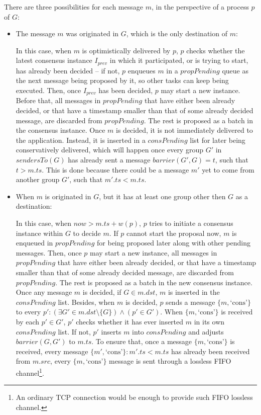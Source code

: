 \documentclass[times, 10pt]{article}
\begin{document}
There are three possibilities for each message $m$, in the perspective of a process $p$ of $G$:

\begin{itemize}
  \item The message $m$ was originated in $G$, which is the only destination of $m$:
  
  In this case, when $m$ is optimistically delivered by $p$, $p$ checks whether the latest consensus instance $I_{prev}$ in which it participated, or is trying to start, has already been decided -- if not, $p$ enqueues $m$ in a $propPending$ queue as the next message being proposed by it, so other tasks can keep being executed. Then, once $I_{prev}$ has been decided, $p$ may start a new instance. Before that, all messages in $propPending$ that have either been already decided, or that have a timestamp smaller than that of some already decided message, are discarded from $propPending$. The rest is proposed as a batch in the consensus instance. Once $m$ is decided, it is not immediately delivered to the application. Instead, it is inserted in a $consPending$ list for later being conservatively delivered, which will happen once every group $G'$ in $sendersTo(G)$ has already sent a message $barrier(G',G) = t$, such that $t > m.ts$. This is done because there could be a message $m'$ yet to come from another group $G'$, such that $m'.ts < m.ts$.

  \item When $m$ is originated in $G$, but it has at least one group other then $G$ as a destination:
  
  In this case, when $now > m.ts + w(p)$, $p$ tries to initiate a consensus instance within $G$ to decide $m$. If $p$ cannot start the proposal now, $m$ is enqueued in $propPending$ for being proposed later along with other pending messages. Then, once $p$ may start a new instance, all messages in $propPending$ that have either been already decided, or that have a timestamp smaller than that of some already decided message, are discarded from $propPending$. The rest is proposed as a batch in the new consensus instance. Once any message $m$ is decided, if $G \in m.dst$, $m$ is inserted in the $consPending$ list. Besides, when $m$ is decided, $p$ sends a message $\{m, \text{`cons'}\}$ to every \mbox{$p' : (\exists G' \in m.dst \setminus \{G\}) \wedge (p' \in G')$}. When $\{m, \text{`cons'}\}$ is received by each $p' \in G'$, $p'$ checks whether it has ever inserted $m$ in its own $consPending$ list. If not, $p'$ inserts $m$ into $consPending$ and adjusts $barrier(G, G')$ to $m.ts$. To ensure that, once a message $\{m, \text{`cons'}\}$ is received, every message \mbox{$\{m', \text{`cons'}\}:m'.ts<m.ts$} has already been received from $m.src$, every $\{m, \text{`cons'}\}$ message is sent through a lossless FIFO channel\footnote{An ordinary TCP connection would be enough to provide such FIFO lossless channel.}.
  

\end{itemize}
\end{document}
